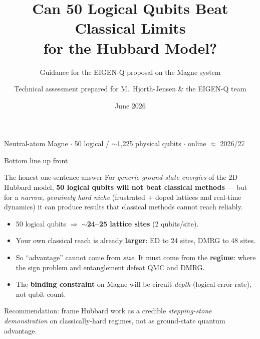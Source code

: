 \documentclass[aspectratio=169,11pt]{beamer}
\title{\large Can 50 Logical Qubits Beat Classical Limits\\ for the Hubbard Model?}
\subtitle{\normalsize Guidance for the EIGEN-Q proposal on the Magne system}
\author{\small Technical assessment prepared for M.~Hjorth-Jensen \& the EIGEN-Q team}
\date{\small June 2026}
\begin{document}
\begin{frame}[plain]
  \titlepage
  \begin{center}\small\color{qngray}
  Neutral-atom Magne $\cdot$ 50 logical / $\sim$1{,}225 physical qubits $\cdot$ online $\approx$ 2026/27
  \end{center}
\end{frame}

\begin{frame}{Bottom line up front}
\begin{block}{The honest one-sentence answer}
For \emph{generic ground-state energies} of the 2D Hubbard model, \textbf{50 logical
qubits will not beat classical methods} --- but for a \emph{narrow, genuinely hard
niche} (frustrated $+$ doped lattices and real-time dynamics) it can produce results
that classical methods cannot reach reliably.
\end{block}

\vspace{2pt}
\begin{itemize}
  \item 50 logical qubits $\Rightarrow$ \textbf{$\sim$24--25 lattice sites} (2 qubits/site).
  \item Your own classical reach is already \textbf{larger}: ED to 24 sites, DMRG to 48 sites.
  \item So ``advantage'' cannot come from \emph{size}. It must come from the \textbf{regime}:
        where the sign problem and entanglement defeat QMC and DMRG.
  \item The \textbf{binding constraint} on Magne will be circuit \emph{depth}
        (logical error rate), not qubit count.
\end{itemize}

\vspace{2pt}
{\small\color{qngray} Recommendation: frame Hubbard work as a credible
\emph{stepping-stone demonstration} on classically-hard regimes, not as ground-state quantum advantage.}
\end{frame}
\end{document}
